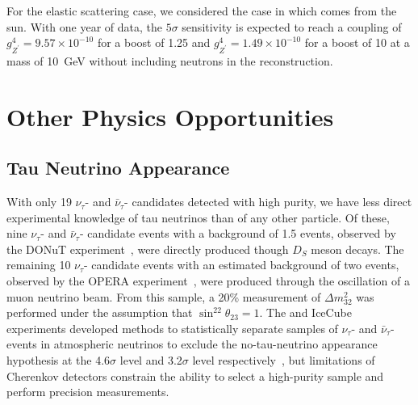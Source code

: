 For the elastic scattering case, we considered the case in which  comes from the sun. 
With one year of data, the $5\sigma$ sensitivity is expected to reach a coupling of $g_{Z^\prime}^4 = 9.57 \times 10^{-10}$ for a boost of 1.25 and $g_{Z^\prime}^4 = 1.49 \times 10^{-10}$ for a boost of 10 at a  mass of \SI{10}{GeV} without including neutrons in the reconstruction.



\section{Other  Physics Opportunities}
\label{sec:otheropps}

\subsection{Tau Neutrino Appearance} 



With only 19 $\nu_{\tau}$- and $\bar{\nu}_{\tau}$- candidates detected with high purity, we have less direct experimental knowledge of tau neutrinos than of any other  particle. Of these, nine $\nu_{\tau}$- and $\bar{\nu}_{\tau}$- candidate events with a background of 1.5 events, observed by the DONuT experiment~\cite{Kodama:2000mp, Kodama:2007aa}, were directly produced though $D_S$ meson decays.  The remaining 10 $\nu_{\tau}$- candidate events with an estimated background of two events, observed by the OPERA experiment~\cite{Guler:2000bd,Agafonova:2018auq}, were produced through the oscillation of a muon neutrino beam. From this sample, a 20\% measurement of $\Delta m^{2}_{32}$ was performed under the assumption that $\sin^22\theta_{23} = 1$.  The \superk and IceCube experiments developed methods to statistically separate samples of $\nu_{\tau}$- and $\bar{\nu}_{\tau}$- events in atmospheric neutrinos to exclude the no-tau-neutrino appearance hypothesis at the 4.6$\sigma$ level and 3.2$\sigma$ level respectively~\cite{Abe:2012jj, Li:2017dbe, Aartsen:2019tjl}, but limitations of Cherenkov detectors constrain the ability to select a high-purity sample and perform precision measurements.



